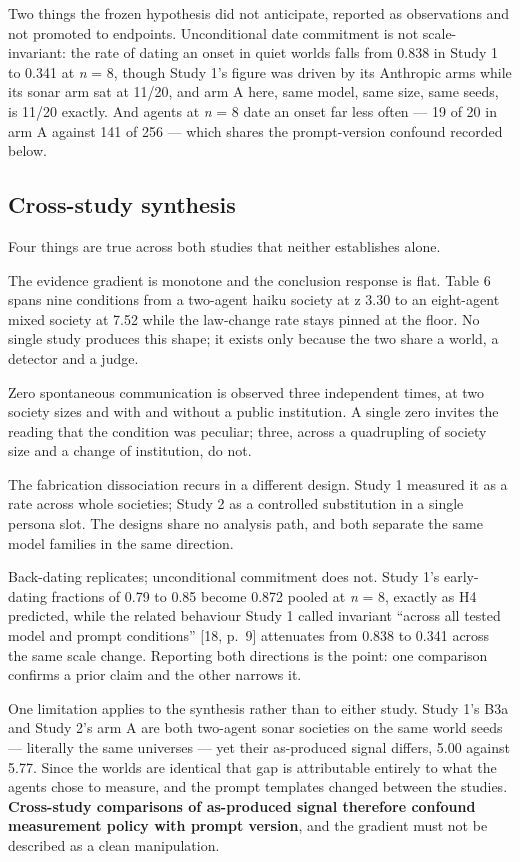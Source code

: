 \documentclass[pdflatex,sn-basic]{sn-jnl}
\begin{document}
Two things the frozen hypothesis did not anticipate, reported as observations and not
promoted to endpoints. Unconditional date commitment is not scale-invariant: the rate of
dating an onset in quiet worlds falls from 0.838 in Study 1 to 0.341 at \emph{n} = 8, though
Study 1's figure was driven by its Anthropic arms while its sonar arm sat at 11/20, and
arm A here, same model, same size, same seeds, is 11/20 exactly. And agents at \emph{n} = 8
date an onset far less often --- 19 of 20 in arm A against 141 of 256 --- which shares the
prompt-version confound recorded below.

\hypertarget{cross-study-synthesis}{%
\subsection{Cross-study synthesis}\label{cross-study-synthesis}}

Four things are true across both studies that neither establishes alone.

The evidence gradient is monotone and the conclusion response is flat. Table 6 spans
nine conditions from a two-agent haiku society at \textbar z\textbar{} 3.30 to an eight-agent mixed society
at 7.52 while the law-change rate stays pinned at the floor. No single study produces this
shape; it exists only because the two share a world, a detector and a judge.

Zero spontaneous communication is observed three independent times, at two society
sizes and with and without a public institution. A single zero invites the reading that
the condition was peculiar; three, across a quadrupling of society size and a change of
institution, do not.

The fabrication dissociation recurs in a different design. Study 1 measured it as a
rate across whole societies; Study 2 as a controlled substitution in a single persona
slot. The designs share no analysis path, and both separate the same model families in the
same direction.

Back-dating replicates; unconditional commitment does not. Study 1's early-dating
fractions of 0.79 to 0.85 become 0.872 pooled at \emph{n} = 8, exactly as H4 predicted, while the related behaviour Study 1 called invariant ``across all tested model and prompt
conditions'' {[}18, p.~9{]} attenuates from 0.838 to 0.341 across the same scale change. Reporting both
directions is the point: one comparison confirms a prior claim and the other narrows it.

One limitation applies to the synthesis rather than to either study. Study 1's B3a and Study 2's
arm A are both two-agent sonar societies on the same world seeds --- literally the same universes
--- yet their as-produced signal differs, 5.00 against 5.77. Since the worlds are identical that gap is attributable entirely to what the agents chose
to measure, and the prompt templates changed between the studies. \textbf{Cross-study
comparisons of as-produced signal therefore confound measurement policy with prompt
version}, and the gradient must not be described as a clean manipulation.
\end{document}
